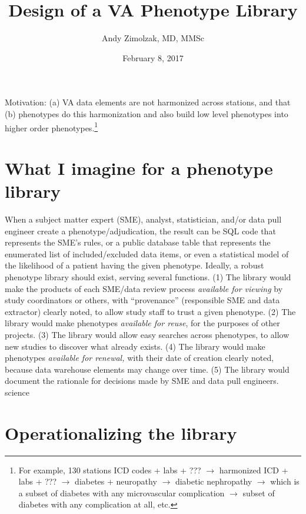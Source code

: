 \documentclass{tufte-handout}
\title{Design of a VA Phenotype Library}
\author{Andy Zimolzak, MD, MMSc}
\date{February 8, 2017}
\begin{document}
\maketitle

Motivation: (a) VA data elements are not harmonized across stations,
and that (b) phenotypes do this harmonization and also build low level
phenotypes into higher order phenotypes.\footnote{For example, 130
  stations ICD codes + labs + ??? $\to$ harmonized ICD + labs + ???
  $\to$ diabetes + neuropathy $\to$ diabetic nephropathy $\to$ which
  is a subset of diabetes with any microvascular complication $\to$
  subset of diabetes with any complication at all, etc.}

\section{What I imagine for a phenotype library}

When a subject matter expert (SME), analyst, statistician, and/or data
pull engineer create a phenotype/adjudication, the result can be SQL code that
represents the SME's rules, or a public database table that represents
the enumerated list of included/excluded data items, or even a
statistical model of the likelihood of a patient having the given
phenotype. Ideally, a robust phenotype library should exist, serving
several functions. (1) The library would make the products of each
SME/data review process \emph{available for viewing} by study
coordinators or others, with ``provenance'' (responsible SME and data
extractor) clearly noted, to allow study staff to trust a given
phenotype. (2) The library would make phenotypes \emph{available for
  reuse}, for the purposes of other projects. (3) The library would
allow easy searches across phenotypes, to allow new studies to
discover what already exists. (4) The library would make phenotypes
\emph{available for renewal,} with their date of creation clearly
noted, because data warehouse elements may change over time. (5) The
library would document the rationale for decisions made by SME and
data pull engineers.%
science

\section{Operationalizing the library}
\end{document}
